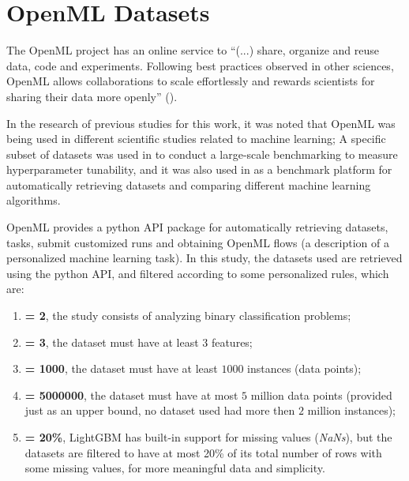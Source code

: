 \section{OpenML Datasets}

The OpenML project has an online service to ``(...) share, organize
and reuse data, code and experiments. Following best practices observed in other sciences, OpenML allows collaborations to scale effortlessly and rewards scientists for sharing
their data more openly'' (\cite{Vanschoren:2014:ONS:2641190.2641198}).

In the research of previous studies for this work, it was noted that OpenML was being used in different scientific studies related to machine learning; A specific subset of datasets was used in \cite{probst2018tunability} to conduct a large-scale benchmarking to measure hyperparameter tunability, and it was also used in \cite{couronne2018random} as a benchmark platform for automatically retrieving datasets and comparing different machine learning algorithms.

OpenML provides a python API package for automatically retrieving datasets, tasks, submit customized runs and obtaining OpenML flows (a description of a personalized machine learning task). In this study, the datasets used are retrieved using the python API, and filtered according to some personalized rules, which are:

\begin{enumerate}
    \item  \textbf{ = 2}, the study consists of analyzing binary classification problems;
    \item  \textbf{ = 3}, the dataset must have at least 3 features;
    \item  \textbf{ = 1000}, the dataset must have at least $1000$ instances (data points);
    \item  \textbf{ = 5000000}, the dataset must have at most $5$ million data points (provided just as an upper bound, no dataset used had more then $2$ million instances);
    \item  \textbf{ = 20\%}, LightGBM has built-in support for missing values (\textit{NaNs}), but the datasets are filtered to have at most 20\% of its total number of rows with some missing values, for more meaningful data and simplicity.
\end{enumerate}


